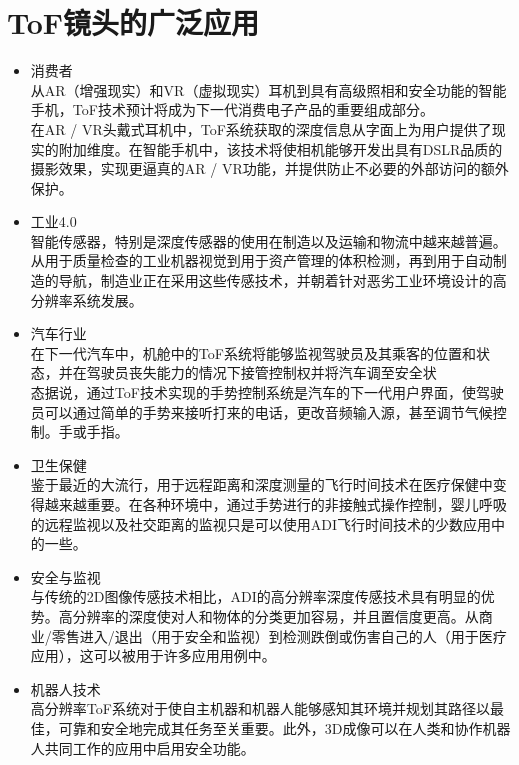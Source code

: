 \documentclass[UTF8]{ctexart}
\begin{document}
\section{ToF镜头的广泛应用}
\begin{itemize}
	\item 消费者\\从AR（增强现实）和VR（虚拟现实）耳机到具有高级照相和安全功能的智能手机，ToF技术预计将成为下一代消费电子产品的重要组成部分。\\
	在AR / VR头戴式耳机中，ToF系统获取的深度信息从字面上为用户提供了现实的附加维度。在智能手机中，该技术将使相机能够开发出具有DSLR品质的摄影效果，实现更逼真的AR / VR功能，并提供防止不必要的外部访问的额外保护。
	\item 工业4.0\\
	智能传感器，特别是深度传感器的使用在制造以及运输和物流中越来越普遍。\\
	从用于质量检查的工业机器视觉到用于资产管理的体积检测，再到用于自动制造的导航，制造业正在采用这些传感技术，并朝着针对恶劣工业环境设计的高分辨率系统发展。
	\item 汽车行业\\
	在下一代汽车中，机舱中的ToF系统将能够监视驾驶员及其乘客的位置和状态，并在驾驶员丧失能力的情况下接管控制权并将汽车调至安全状\\态据说，通过ToF技术实现的手势控制系统是汽车的下一代用户界面，使驾驶员可以通过简单的手势来接听打来的电话，更改音频输入源，甚至调节气候控制。手或手指。
	\item 卫生保健\\
	鉴于最近的大流行，用于远程距离和深度测量的飞行时间技术在医疗保健中变得越来越重要。在各种环境中，通过手势进行的非接触式操作控制，婴儿呼吸的远程监视以及社交距离的监视只是可以使用ADI飞行时间技术的少数应用中的一些。
	\item 安全与监视\\
	与传统的2D图像传感技术相比，ADI的高分辨率深度传感技术具有明显的优势。高分辨率的深度使对人和物体的分类更加容易，并且置信度更高。从商业/零售进入/退出（用于安全和监视）到检测跌倒或伤害自己的人（用于医疗应用），这可以被用于许多应用用例中。
	\item 机器人技术\\
	高分辨率ToF系统对于使自主机器和机器人能够感知其环境并规划其路径以最佳，可靠和安全地完成其任务至关重要。此外，3D成像可以在人类和协作机器人共同工作的应用中启用安全功能。
\end{itemize}
\end{document}
